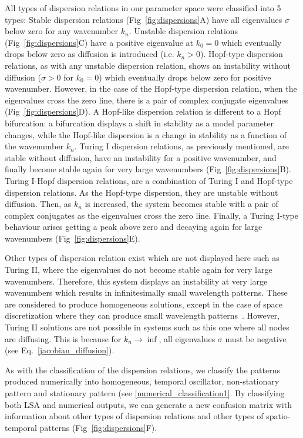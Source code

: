 All types of dispersion relations in our parameter space were classified into 5 types:
Stable dispersion relations (Fig~\ref{fig:dispersions}A) have all eigenvalues $\sigma$ below zero for any wavenumber $k_{n}$.
Unstable dispersion relations (Fig~\ref{fig:dispersions}C) have a positive eigenvalue at $k_{0}=0$ which eventually drops below zero as diffusion is introduced (i.e. $k_{n}>0$).
Hopf-type dispersion relations, as with any unstable dispersion relation, shows an instability without diffusion ($\sigma>0$ for $k_{0}=0$) which eventually drops below zero for positive wavenumber. However, in the case of the Hopf-type dispersion relation, when the eigenvalues cross the zero line, there is a pair of complex conjugate eigenvalues (Fig~\ref{fig:dispersions}D).
A Hopf-like dispersion relation is different to a Hopf bifurcation: a bifurcation displays a shift in stability as a model parameter changes, while the Hopf-like dispersion is a change in stability as a function of the wavenumber $k_{n}$.
Turing I dispersion relations, as previously mentioned, are stable without diffusion, have an instability for a positive wavenumber, and finally become stable again for very large wavenumbers (Fig~\ref{fig:dispersions}B).
Turing I-Hopf dispersion relations, are a combination of Turing I and Hopf-type dispersion relations. As the Hopf-type dispersion, they are unstable without diffusion. Then, as $k_{n}$ is increased, the system becomes stable with a pair of complex conjugates as the eigenvalues cross the zero line.
Finally, a Turing I-type behaviour arises getting a peak above zero and decaying again for large wavenumbers (Fig~\ref{fig:dispersions}E).

Other types of dispersion relation exist which are not displayed here such as Turing II, where the eigenvalues do not become stable again for very large wavenumbers.
Therefore, this system displays an instability at very large wavenumbers which results in infinitesimally small wavelength patterns.
These are considered to produce homogeneous solutions, except in the case of space discretization where they can produce small wavelength patterns~\parencite{Wang2022}.
However, Turing II solutions are not possible in systems such as this one where all nodes are diffusing.
This is because for $k_n \rightarrow \inf$, all eigenvalues $\sigma$ must be negative (see Eq.~\ref{jacobian_diffusion}).

As with the classification of the dispersion relations, we classify the patterns produced numerically into homogeneous, temporal oscillator, non-stationary pattern and stationary pattern (see \ref{numerical_classification1}.
By classifying both LSA and numerical outputs, we can generate a new confusion matrix with information about other types of dispersion relations and other types of spatio-temporal patterns (Fig~\ref{fig:dispersions}F).

